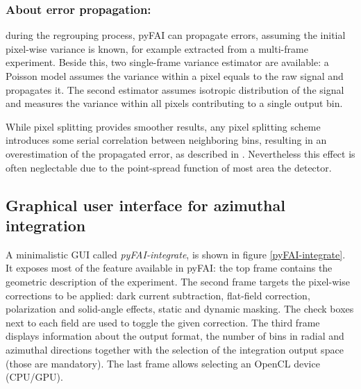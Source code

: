 \documentclass{iucr}
\begin{document}
\subsubsection{About error propagation:}
during the regrouping process, pyFAI can propagate errors, assuming the
initial pixel-wise variance is known, for example extracted from a
multi-frame experiment. Beside this, two single-frame variance estimator are
available: a Poisson model assumes the variance within a pixel equals to the
raw signal and propagates it. The second estimator assumes isotropic
distribution of the signal and measures the variance within all pixels
contributing to a single output bin. 

While pixel splitting provides smoother
results, any pixel splitting scheme introduces some serial correlation between
neighboring bins, resulting in an overestimation of the propagated error,
as described in \cite{billinge2014}. 
Nevertheless this effect is often neglectable due to the point-spread function
of most area the detector.

\subsection{Graphical user interface for azimuthal integration}

A minimalistic GUI called \textit{pyFAI-integrate}, is
shown in figure \ref{pyFAI-integrate}.
It exposes most of the feature available in pyFAI:
the top frame contains the geometric description of the experiment.
The second frame targets the pixel-wise corrections to be applied: dark current
subtraction, flat-field correction, polarization and solid-angle effects, static and dynamic
masking. The check boxes next to each field are used to toggle the given correction.
The third frame displays information about the output format, the
number of bins in radial and azimuthal directions together with the
selection of the integration output space (those are mandatory).
The last frame allows selecting an OpenCL device (CPU/GPU).
\end{document}
